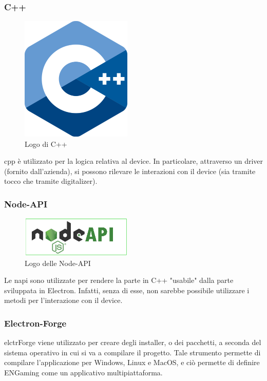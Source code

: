 \subsubsection{C++}
\begin{figure}[h]
    \centering
    \includegraphics[width=150pt]{images/technologies/cpp.png}
    \caption{Logo di C++}
    \label{fig:cpp}
\end{figure}
\gls{cpp} è utilizzato per la logica relativa al device. In particolare, attraverso un driver (fornito dall'azienda), si possono rilevare le interazioni con il device (sia tramite tocco che tramite digitalizer).

\subsubsection{Node-API}
\begin{figure}[h]
    \centering
    \includegraphics[width=150pt]{images/technologies/nodeapi.png}
    \caption{Logo delle Node-API}
    \label{fig:nodeapi}
\end{figure}
Le \gls{napi} sono utilizzate per rendere la parte in C++ "usabile" dalla parte sviluppata in Electron.
Infatti, senza di esse, non sarebbe possibile utilizzare i metodi per l'interazione con il device.

\subsubsection{Electron-Forge}
\gls{elctrForge} viene utilizzato per creare degli installer, o dei pacchetti, a seconda del sistema operativo in cui si va a compilare il progetto.
Tale strumento permette di compilare l'applicazione per Windows, Linux e MacOS, e ciò permette di definire ENGaming come un applicativo multipiattaforma.
\newpage
